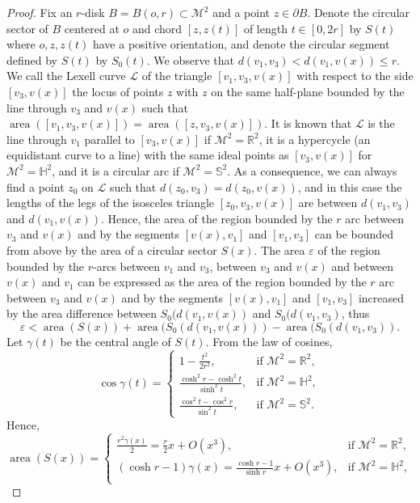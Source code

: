 \documentclass[12pt,reqno]{amsart}
\theoremstyle{remark}
\newcommand{\R}{{\mathbb R}}
\newcommand{\hyp}{{\mathbb H}}
\newcommand{\sph}{{\mathbb S}}
\newcommand{\M}{\mathcal{M}}
\DeclareMathOperator{\area}{\mathrm{area}}
\begin{document}
\begin{proof}
Fix an $r$-disk $B=B(o,r)\subset\M^2$ and a point $z\in\partial B$. Denote the circular sector of $B$ centered at $o$ and chord $[z,z(t)]$ of length $t\in [0,2r]$ by $S(t)$ where $o,z,z(t)$ have a positive orientation, and denote the circular segment defined by $S(t)$ by $S_0(t)$. We observe that $d(v_1,v_3)<d(v_1,v(x))\leq r$. We call the Lexell curve $\mathcal{L}$ of the triangle $[v_1,v_3,v(x)]$ with respect to the side $[v_3,v(x)]$ the locus of points $z$ with $z$ on the same half-plane bounded by the line through $v_3$ and $v(x)$ such that $\area([v_1,v_3,v(x)])=\area([z,v_3,v(x)])$. It is known that $\mathcal{L}$ is the line through $v_1$ parallel to $[v_3,v(x)]$ if $\M^2=\R^2$, it is a hypercycle (an equidistant curve to a line) with the same ideal points as $[v_3,v(x)]$ for $\M^2=\hyp^2$, and it is a circular arc if $\M^2=\sph^2$. As a consequence, we can always find a point $z_0$ on $\mathcal{L}$ such that $d(z_0,v_3)=d(z_0,v(x))$, and in this case the lengths of the legs of the isosceles triangle $[z_0,v_3,v(x)]$ are between $d(v_1,v_3)$ and $d(v_1,v(x))$. Hence, the area of the region bounded by the $r$ arc between $v_3$ and $v(x)$ and by the segments $[v(x),v_1]$ and $[v_1,v_3]$ can be bounded from above by the area of a circular sector $S(x)$. The area $\varepsilon$ of the region bounded by the $r$-arcs between $v_1$ and $v_3$, between $v_3$ and $v(x)$ and between $v(x)$ and $v_1$ can be expressed as the area of the region bounded by the $r$ arc between $v_3$ and $v(x)$ and by the segments $[v(x),v_1]$ and $[v_1,v_3]$ increased by the area difference between $S_0(d(v_1,v(x))$ and $S_0(d(v_1,v_3)$, thus
\[
\varepsilon<\area(S(x))+\area(S_0(d(v_1,v(x)))-\area(S_0(d(v_1,v_3)).
\]
Let $\gamma(t)$ be the central angle of $S(t)$. From the law of cosines,
\[
\cos\gamma(t)=\begin{cases}
    1-\frac{t^2}{2r^2},&\text{if }\M^2=\R^2,\\
    \frac{\cosh^2 r-\cosh^2 t}{\sinh^2 t},&\text{if }\M^2=\hyp^2,\\
    \frac{\cos^2 t-\cos^2 r}{\sin^2 t},&\text{if }\M^2=\sph^2.
\end{cases}
\]
Hence,
\begin{equation}\label{eq:area-of-sector}
\area(S(x))=\begin{cases}
    \frac{r^2\gamma(x)}{2}=\frac{r}{2}x+O(x^3),&\text{if }\M^2=\R^2,\\
    (\cosh r-1)\gamma(x)=\frac{\cosh r-1}{\sinh r}x+O(x^3),&\text{if }\M^2=\hyp^2,\\

\end{cases}
\end{equation}
\end{proof}
\end{document}
